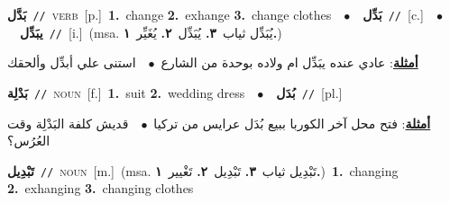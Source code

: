 \documentclass[10pt,a4paper,twoside]{article} %
\begin{document}
\begin{multicols}{2}
{\setlength\topsep{0pt}\textbf{\foreignlanguage{arabic}{بَدَّل}}\ {\color{gray}\texttt{//}\color{black}}\ \textsc{verb}\ [p.]\ \textbf{1.}~change  \textbf{2.}~exhange  \textbf{3.}~change clothes\ \ $\bullet$\ \ \setlength\topsep{0pt}\textbf{\foreignlanguage{arabic}{بَدِّل}}\ {\color{gray}\texttt{//}\color{black}}\ [c.]\ \ $\bullet$\ \ \setlength\topsep{0pt}\textbf{\foreignlanguage{arabic}{يبَدِّل}}\ {\color{gray}\texttt{//}\color{black}}\ [i.]\ \color{gray}(msa. \foreignlanguage{arabic}{يُبَدِّل ثياب}~\foreignlanguage{arabic}{\textbf{٣.}}  \foreignlanguage{arabic}{يُبَدِّل}~\foreignlanguage{arabic}{\textbf{٢.}}  \foreignlanguage{arabic}{يُغَيِّر}~\foreignlanguage{arabic}{\textbf{١.}})\color{black}\  \begin{flushright}\color{gray}\foreignlanguage{arabic}{\textbf{\underline{\foreignlanguage{arabic}{أمثلة}}}: عادي عنده يبَدِّل ام ولاده بوحدة من الشارع\ $\bullet$\ \  استنى علي أبدِّل وألحقك}\end{flushright}\color{black}} \vspace{2mm}

{\setlength\topsep{0pt}\textbf{\foreignlanguage{arabic}{بَدْلِة}}\ {\color{gray}\texttt{//}\color{black}}\ \textsc{noun}\ [f.]\ \textbf{1.}~suit  \textbf{2.}~wedding dress\ \ $\bullet$\ \ \setlength\topsep{0pt}\textbf{\foreignlanguage{arabic}{بُدَل}}\ {\color{gray}\texttt{//}\color{black}}\ [pl.]\  \begin{flushright}\color{gray}\foreignlanguage{arabic}{\textbf{\underline{\foreignlanguage{arabic}{أمثلة}}}: فتح محل آخر الكوربا ببيع بُدَل عرايس من تركيا\ $\bullet$\ \  قديش كلفة البَدْلِة وقت العُرُس؟}\end{flushright}\color{black}} \vspace{2mm}

{\setlength\topsep{0pt}\textbf{\foreignlanguage{arabic}{تَبْدِيل}}\ {\color{gray}\texttt{//}\color{black}}\ \textsc{noun}\ [m.]\ \color{gray}(msa. \foreignlanguage{arabic}{تَبْدِيل ثياب}~\foreignlanguage{arabic}{\textbf{٣.}}  \foreignlanguage{arabic}{تَبْدِيل}~\foreignlanguage{arabic}{\textbf{٢.}}  \foreignlanguage{arabic}{تَغْيير}~\foreignlanguage{arabic}{\textbf{١.}})\color{black}\ \textbf{1.}~changing  \textbf{2.}~exhanging  \textbf{3.}~changing clothes\ } \vspace{2mm}


\end{multicols}
\end{document}
